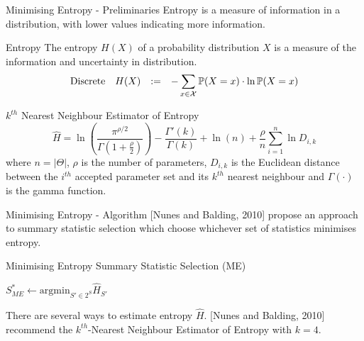 \documentclass[aspectratio=169]{beamer}
\begin{document}
\begin{frame}{Minimising Entropy - Preliminaries}
  Entropy is a measure of information in a distribution, with lower values indicating more information.
  \begin{block}{Entropy}
    {\small The entropy $H(X)$ of a probability distribution $X$ is a measure of the information and uncertainty in distribution.}
    \[\everymath={\displaystyle}\begin{array}{rrcl}
      \text{Discrete}&H(X)&:=&-\sum_{x\in\mathcal{X}}\mathbb{P}(X=x)\cdot\ln\mathbb{P}(X=x)%
    \end{array}\]
  \end{block}

  \begin{block}{$k^{th}$ Nearest Neighbour Estimator of Entropy}
    \[ \hat{H}=\ln\left(\frac{\pi^{\rho/2}}{\Gamma\left(1+\frac\rho2\right)}\right)-\frac{\Gamma'(k)}{\Gamma(k)}+\ln(n)+\frac\rho{n}\sum_{i=1}^n\ln D_{i,k} \]
    {\small where $n=|\Theta|$, $\rho$ is the number of parameters, $D_{i,k}$ is the Euclidean distance between the $i^{th}$ accepted parameter set and its $k^{th}$ nearest neighbour and $\Gamma(\cdot)$ is the gamma function.}
  \end{block}
\end{frame}

\begin{frame}{Minimising Entropy - Algorithm}
  [Nunes and Balding, 2010] propose an approach to summary statistic selection which choose whichever set of statistics minimises entropy.
  \begin{block}{Minimising Entropy Summary Statistic Selection (ME)}
    \begin{algorithm}[H]
      $S_{ME}^*\leftarrow\text{argmin}_{S'\in 2^S}\hat{H}_{S'}$\\
    \end{algorithm}
  \end{block}

  There are several ways to estimate entropy $\hat{H}$. [Nunes and Balding, 2010] recommend the $k^{th}$-Nearest Neighbour Estimator of Entropy with $k=4$.
\end{frame}
\end{document}
